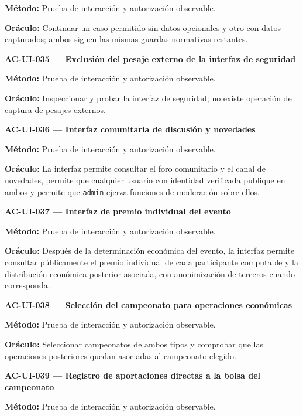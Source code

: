 \documentclass[10pt,letterpaper]{article}
\begin{document}
\textbf{Método:} Prueba de interacción y autorización observable.\par
\textbf{Oráculo:} Continuar un caso permitido sin datos opcionales y otro con datos capturados; ambos siguen las mismas guardas normativas restantes.\par\vspace{0.45em}
\noindent\textbf{AC-UI-035 --- Exclusión del pesaje externo de la interfaz de seguridad}\par
\textbf{Método:} Prueba de interacción y autorización observable.\par
\textbf{Oráculo:} Inspeccionar y probar la interfaz de seguridad; no existe operación de captura de pesajes externos.\par\vspace{0.45em}
\noindent\textbf{AC-UI-036 --- Interfaz comunitaria de discusión y novedades}\par
\textbf{Método:} Prueba de interacción y autorización observable.\par
\textbf{Oráculo:} La interfaz permite consultar el foro comunitario y el canal de novedades, permite que cualquier usuario con identidad verificada publique en ambos y permite que \texttt{admin} ejerza funciones de moderación sobre ellos.\par\vspace{0.45em}
\noindent\textbf{AC-UI-037 --- Interfaz de premio individual del evento}\par
\textbf{Método:} Prueba de interacción y autorización observable.\par
\textbf{Oráculo:} Después de la determinación económica del evento, la interfaz permite consultar públicamente el premio individual de cada participante computable y la distribución económica posterior asociada, con anonimización de terceros cuando corresponda.\par\vspace{0.45em}
\noindent\textbf{AC-UI-038 --- Selección del campeonato para operaciones económicas}\par
\textbf{Método:} Prueba de interacción y autorización observable.\par
\textbf{Oráculo:} Seleccionar campeonatos de ambos tipos y comprobar que las operaciones posteriores quedan asociadas al campeonato elegido.\par\vspace{0.45em}
\noindent\textbf{AC-UI-039 --- Registro de aportaciones directas a la bolsa del campeonato}\par
\textbf{Método:} Prueba de interacción y autorización observable.\par
\end{document}
